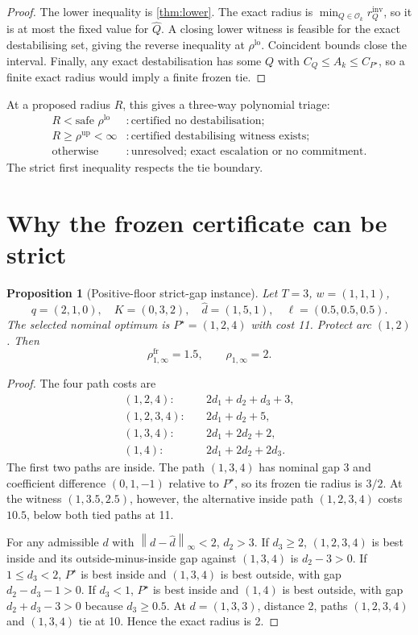 \documentclass[11pt]{article}
\newtheorem{proposition}[theorem]{Proposition}
\theoremstyle{definition}
\newcommand{\cO}{\mathcal{O}}
\newcommand{\norm}[1]{\left\lVert #1\right\rVert}
\newcommand{\dhat}{\widehat d}
\newcommand{\ellv}{\ell}
\newcommand{\rhofr}{\rho^{\mathrm{fr}}}
\newcommand{\rholo}{\rho^{\mathrm{lo}}}
\newcommand{\rhohi}{\rho^{\mathrm{up}}}
\begin{document}
\begin{proof}
The lower inequality is \cref{thm:lower}. The exact radius is $\min_{Q\in\cO_k}r_Q^{\mathrm{inv}}$, so it is at most the fixed value for $\widehat Q$. A closing lower witness is feasible for the exact destabilising set, giving the reverse inequality at $\rholo$. Coincident bounds close the interval. Finally, any exact destabilisation has some $Q$ with $C_Q\le A_k\le C_{P^\star}$, so a finite exact radius would imply a finite frozen tie.
\end{proof}

At a proposed radius $R$, this gives a three-way polynomial triage:
\[
\begin{array}{ll}
R<\text{safe }\rholo &: \text{certified no destabilisation};\\
R\ge\rhohi<\infty &: \text{certified destabilising witness exists};\\
\text{otherwise} &: \text{unresolved; exact escalation or no commitment}.
\end{array}
\]
The strict first inequality respects the tie boundary.

\section{Why the frozen certificate can be strict}\label{sec:counterexample}

\begin{proposition}[Positive-floor strict-gap instance]\label{prop:counterexample}
Let $T=3$, $w=(1,1,1)$,
\[
q=(2,1,0),\quad K=(0,3,2),\quad
\dhat=(1,5,1),\quad \ellv=(0.5,0.5,0.5).
\]
The selected nominal optimum is $P^\star=(1,2,4)$ with cost 11. Protect arc $(1,2)$. Then
\[
\rhofr_{1,\infty}=1.5,
\qquad
\rho_{1,\infty}=2.
\]
\end{proposition}

\begin{proof}
The four path costs are
\begin{align*}
(1,2,4):&\quad 2d_1+d_2+d_3+3,\\
(1,2,3,4):&\quad 2d_1+d_2+5,\\
(1,3,4):&\quad 2d_1+2d_2+2,\\
(1,4):&\quad 2d_1+2d_2+2d_3.
\end{align*}
The first two paths are inside. The path $(1,3,4)$ has nominal gap 3 and coefficient difference $(0,1,-1)$ relative to $P^\star$, so its frozen tie radius is $3/2$. At the witness $(1,3.5,2.5)$, however, the alternative inside path $(1,2,3,4)$ costs $10.5$, below both tied paths at 11.

For any admissible $d$ with $\norm{d-\dhat}_\infty<2$, $d_2>3$. If $d_3\ge2$, $(1,2,3,4)$ is best inside and its outside-minus-inside gap against $(1,3,4)$ is $d_2-3>0$. If $1\le d_3<2$, $P^\star$ is best inside and $(1,3,4)$ is best outside, with gap $d_2-d_3-1>0$. If $d_3<1$, $P^\star$ is best inside and $(1,4)$ is best outside, with gap $d_2+d_3-3>0$ because $d_3\ge0.5$. At $d=(1,3,3)$, distance 2, paths $(1,2,3,4)$ and $(1,3,4)$ tie at 10. Hence the exact radius is 2.
\end{proof}
\end{document}
